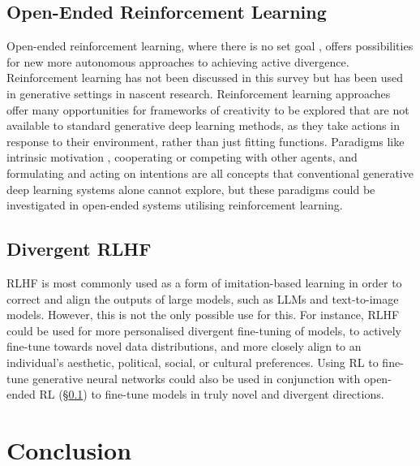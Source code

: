 \subsection{Open-Ended Reinforcement Learning}
\label{c6:subsec:open-ended}

Open-ended reinforcement learning, where there is no set goal \citep{wang2020enhanced}, offers possibilities for new more autonomous approaches to achieving active divergence. 
Reinforcement learning has not been discussed in this survey but has been used in generative settings \citep{luo2020reinforcement} in nascent research. 
Reinforcement learning approaches offer many opportunities for frameworks of creativity to be explored that are not available to standard generative deep learning methods, as they take actions in response to their environment, rather than just fitting functions. 
Paradigms like intrinsic motivation \citep{shaker2016intrinsically}, cooperating or competing with other agents, and formulating and acting on intentions are all concepts that conventional generative deep learning systems alone cannot explore, but these paradigms could be investigated in open-ended systems utilising reinforcement learning.

\subsection{Divergent RLHF}
\label{c6:subsec:divergent-rlhf}

RLHF is most commonly used as a form of imitation-based learning in order to correct and align the outputs of large models, such as LLMs and text-to-image models. 
However, this is not the only possible use for this.
For instance, RLHF could be used for more personalised divergent fine-tuning of models, to actively fine-tune towards novel data distributions, and more closely align to an individual's aesthetic, political, social, or cultural preferences. 
Using RL to fine-tune generative neural networks could also be used in conjunction with open-ended RL (\S \ref{c6:subsec:open-ended}) to fine-tune models in truly novel and divergent directions. 

\section{Conclusion}

